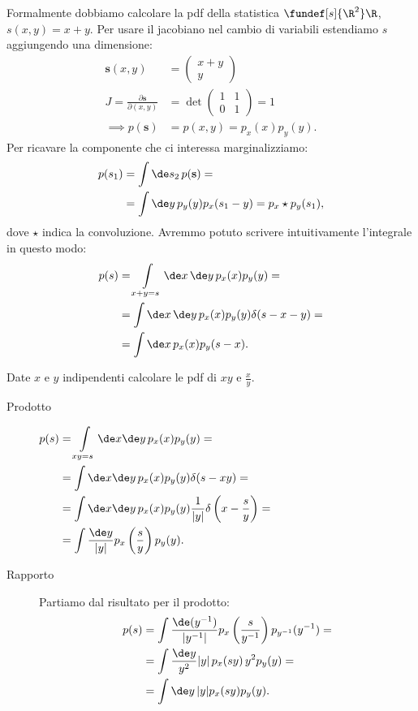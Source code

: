 \begin{solution}
	Formalmente dobbiamo calcolare la pdf della statistica $\fundef[s]{\R^2}\R$,
	$s(x,y)=x+y$.
	Per usare il jacobiano nel cambio di variabili estendiamo $s$ aggiungendo una dimensione:
	\begin{align*}
		\mathbf s(x,y) &= \left(\begin{matrix}
			x+y \\
			y
		\end{matrix} \right) \\
		J = \frac{\partial\mathbf s}{\partial(x,y)} &= \det\left(\begin{matrix}
			1 & 1 \\
			0 & 1
		\end{matrix}\right) = 1 \\
		\implies p(\mathbf s) &= p(x,y) = p_x(x)p_y(y).
	\end{align*}
	Per ricavare la componente che ci interessa marginalizziamo:
	\begin{align*}
		p(s_1) &= \int \de s_2\, p(\mathbf s) = \\
		&= \int \de y\, p_y(y) p_x(s_1 - y) = p_x \star p_y (s_1),
	\end{align*}
	dove $\star$ indica la convoluzione.
	Avremmo potuto scrivere intuitivamente l'integrale in questo modo:
	\begin{align*}
		p(s) &= \int\limits_{x+y = s} \de x\,\de y\, p_x(x) p_y(y) = \\
		&= \int \de x\,\de y\, p_x(x) p_y(y) \delta(s - x - y) = \\
		&= \int \de x\, p_x(x) p_y(s-x).
	\end{align*}
\end{solution}

\begin{exercise}
	Date $x$ e $y$ indipendenti calcolare le pdf di $xy$ e $\frac xy$.
\end{exercise}

\begin{solution}
	\begin{description}
		\item[Prodotto]
			$\begin{aligned}[t]
				p(s) &= \int\limits_{xy=s} \de x\de y\, p_x(x) p_y(y) = \\
				&= \int\de x\de y\, p_x(x)p_y(y)\delta(s-xy) = \\
				&= \int\de x\de y\, p_x(x)p_y(y)\frac1{|y|}\delta\left(x-\frac sy\right) = \\
				&= \int\frac{\de y}{|y|}p_x\left(\frac sy\right)p_y(y).
			\end{aligned}$
		\item[Rapporto]
			Partiamo dal risultato per il prodotto:
			\begin{align*}
				p(s) &= \int\frac{\de(y^{-1})}{|y^{-1}|}p_x\left(\frac s{y^{-1}}\right)p_{y^{-1}}(y^{-1}) = \\
				&= \int\frac{\de y}{y^2}|y|\,p_x(sy)\,y^2 p_y(y) = \\
				&= \int\de y\, |y|p_x(sy)p_y(y).
			\end{align*}
	\end{description}
\end{solution}

